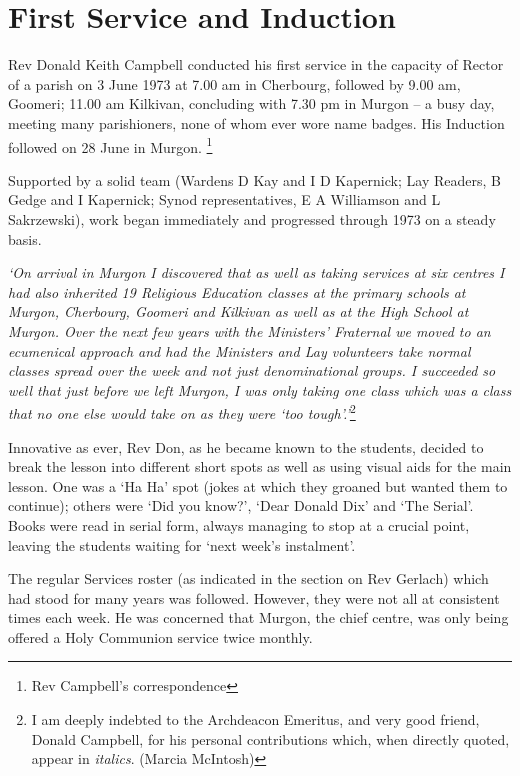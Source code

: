 \hypertarget{first-service-and-induction}{%
\section{First Service and Induction}\label{first-service-and-induction}}

Rev Donald Keith Campbell conducted his first service in the capacity of Rector of a parish on 3 June 1973 at 7.00 am in Cherbourg, followed by 9.00 am, Goomeri; 11.00 am Kilkivan, concluding with 7.30 pm in Murgon -- a busy day, meeting many parishioners, none of whom ever wore name badges. His Induction followed on 28 June in Murgon. \footnote{Rev Campbell's correspondence}

Supported by a solid team (Wardens D Kay and I D Kapernick; Lay Readers, B Gedge and I Kapernick; Synod representatives, E A Williamson and L Sakrzewski), work began immediately and progressed through 1973 on a steady basis.

\emph{`On arrival in Murgon I discovered that as well as taking services at six centres I had also inherited 19 Religious Education classes at the primary schools at Murgon, Cherbourg, Goomeri and Kilkivan as well as at the High School at Murgon. Over the next few years with the Ministers' Fraternal we moved to an ecumenical approach and had the Ministers and Lay volunteers take normal classes spread over the week and not just denominational groups. I succeeded so well that just before we left Murgon, I was only taking one class which was a class that no one else would take on as they were `too tough'.'}\footnote{I am deeply indebted to the Archdeacon Emeritus, and very good friend, Donald Campbell, for his personal contributions which, when directly quoted, appear in \emph{italics}. (Marcia McIntosh)}

Innovative as ever, Rev Don, as he became known to the students, decided to break the lesson into different short spots as well as using visual aids for the main lesson. One was a `Ha Ha' spot (jokes at which they groaned but wanted them to continue); others were `Did you know?', `Dear Donald Dix' and `The Serial'. Books were read in serial form, always managing to stop at a crucial point, leaving the students waiting for `next week's instalment'.

The regular Services roster (as indicated in the section on Rev Gerlach) which had stood for many years was followed. However, they were not all at consistent times each week. He was concerned that Murgon, the chief centre, was only being offered a Holy Communion service twice monthly.

